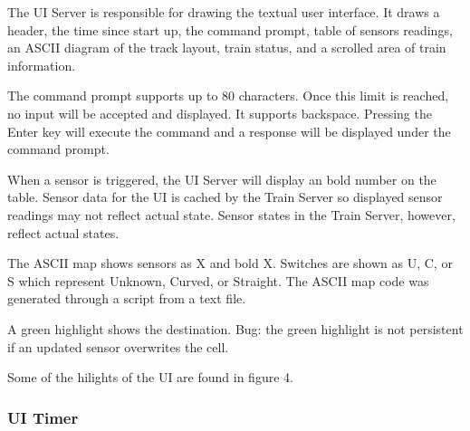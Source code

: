 \documentclass[letterpaper]{article}
\begin{document}
The UI Server is responsible for drawing the textual user interface. It draws a header, the time since start up, the command prompt, table of sensors readings, an ASCII diagram of the track layout, train status, and a scrolled area of train information.

The command prompt supports up to 80 characters. Once this limit is reached, no input will be accepted and displayed. It supports backspace. Pressing the Enter key will execute the command and a response will be displayed under the command prompt.

When a sensor is triggered, the UI Server will display an bold number on the table. Sensor data for the UI is cached by the Train Server so displayed sensor readings may not reflect actual state. Sensor states in the Train Server, however, reflect actual states.

The ASCII map shows sensors as X and bold X. Switches are shown as U, C, or S which represent Unknown, Curved, or Straight. The ASCII map code was generated through a script from a text file.

A green highlight shows the destination. Bug: the green highlight is not persistent if an updated sensor overwrites the cell.

Some of the hilights of the UI are found in figure 4.
\begin{figure}
\noindent{}
\end{figure}


\subsubsection{UI Timer%
  \label{ui-timer}%
}
\end{document}
